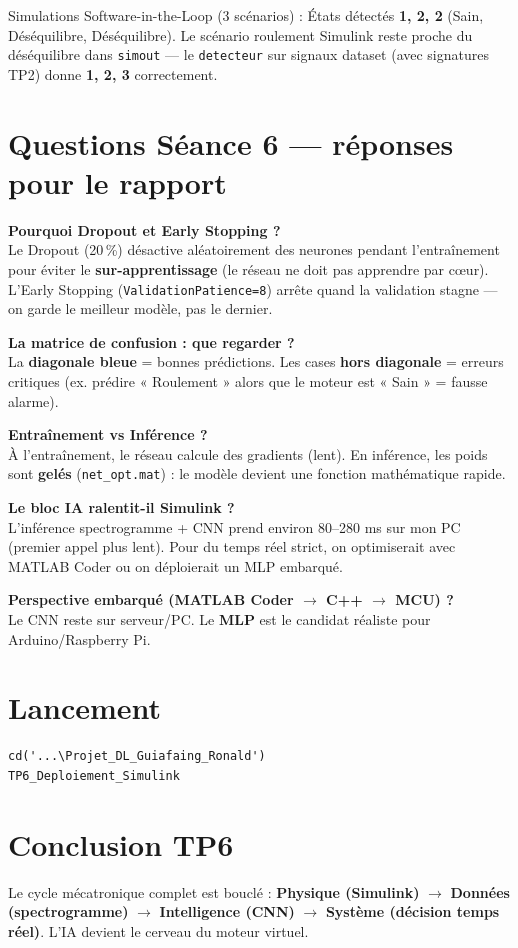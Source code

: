 ﻿\documentclass[11pt,a4paper]{article}
\begin{document}
Simulations Software-in-the-Loop (3 scénarios) : États détectés \textbf{1, 2, 2} (Sain, Déséquilibre, Déséquilibre). Le scénario roulement Simulink reste proche du déséquilibre dans \texttt{simout} — le \texttt{detecteur} sur signaux dataset (avec signatures TP2) donne \textbf{1, 2, 3} correctement.

\section{Questions Séance 6 — réponses pour le rapport}

\textbf{Pourquoi Dropout et Early Stopping ?}\\
Le Dropout (20\,\%) désactive aléatoirement des neurones pendant l'entraînement pour éviter le \textbf{sur-apprentissage} (le réseau ne doit pas apprendre par cœur). L'Early Stopping (\texttt{ValidationPatience=8}) arrête quand la validation stagne — on garde le meilleur modèle, pas le dernier.

\textbf{La matrice de confusion : que regarder ?}\\
La \textbf{diagonale bleue} = bonnes prédictions. Les cases \textbf{hors diagonale} = erreurs critiques (ex. prédire « Roulement » alors que le moteur est « Sain » = fausse alarme).

\textbf{Entraînement vs Inférence ?}\\
À l'entraînement, le réseau calcule des gradients (lent). En inférence, les poids sont \textbf{gelés} (\texttt{net\_opt.mat}) : le modèle devient une fonction mathématique rapide.

\textbf{Le bloc IA ralentit-il Simulink ?}\\
L'inférence spectrogramme + CNN prend environ 80--280 ms sur mon PC (premier appel plus lent). Pour du temps réel strict, on optimiserait avec MATLAB Coder ou on déploierait un MLP embarqué.

\textbf{Perspective embarqué (MATLAB Coder $\rightarrow$ C++ $\rightarrow$ MCU) ?}\\
Le CNN reste sur serveur/PC. Le \textbf{MLP} est le candidat réaliste pour Arduino/Raspberry Pi.

\section{Lancement}
\begin{lstlisting}
cd('...\Projet_DL_Guiafaing_Ronald')
TP6_Deploiement_Simulink
\end{lstlisting}

\section{Conclusion TP6}
Le cycle mécatronique complet est bouclé : \textbf{Physique (Simulink)} $\rightarrow$ \textbf{Données (spectrogramme)} $\rightarrow$ \textbf{Intelligence (CNN)} $\rightarrow$ \textbf{Système (décision temps réel)}. L'IA devient le cerveau du moteur virtuel.
\end{document}

